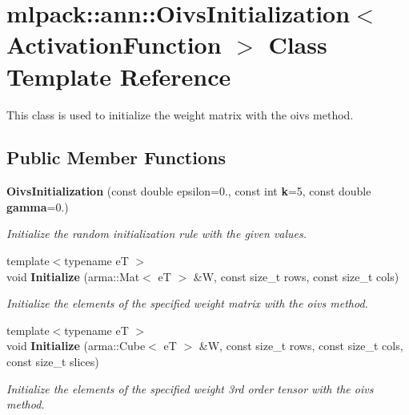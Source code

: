 \section{mlpack\+:\+:ann\+:\+:Oivs\+Initialization$<$ Activation\+Function $>$ Class Template Reference}
\label{classmlpack_1_1ann_1_1OivsInitialization}


This class is used to initialize the weight matrix with the oivs method.  


\subsection*{Public Member Functions}
\begin{DoxyCompactItemize}
\item 
{\bf Oivs\+Initialization} (const double epsilon=0., const int {\bf k}=5, const double {\bf gamma}=0.)
\begin{DoxyCompactList}\small\item\em Initialize the random initialization rule with the given values. \end{DoxyCompactList}\item 
{\footnotesize template$<$typename eT $>$ }\\void {\bf Initialize} (arma\+::\+Mat$<$ eT $>$ \&W, const size\+\_\+t rows, const size\+\_\+t cols)
\begin{DoxyCompactList}\small\item\em Initialize the elements of the specified weight matrix with the oivs method. \end{DoxyCompactList}\item 
{\footnotesize template$<$typename eT $>$ }\\void {\bf Initialize} (arma\+::\+Cube$<$ eT $>$ \&W, const size\+\_\+t rows, const size\+\_\+t cols, const size\+\_\+t slices)
\begin{DoxyCompactList}\small\item\em Initialize the elements of the specified weight 3rd order tensor with the oivs method. \end{DoxyCompactList}\end{DoxyCompactItemize}
